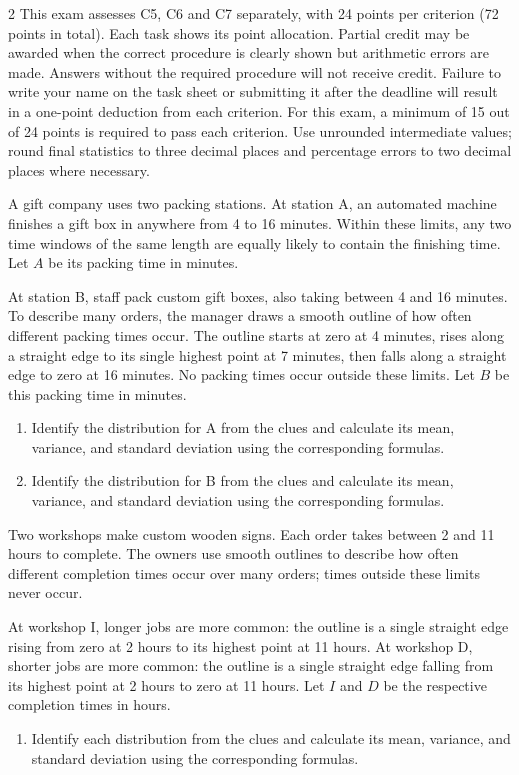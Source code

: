\begin{multicols}{2}
\vspace{-0.25cm}
This exam assesses C5, C6 and C7 separately, with 24 points per criterion
(72 points in total). Each task shows its point allocation. Partial credit
may be awarded when the correct procedure is clearly shown but arithmetic
errors are made. Answers without the required procedure will not receive credit.
Failure to write your name on the task sheet or submitting it after the deadline
will result in a one-point deduction from each criterion.
For this exam, a minimum of 15 out of 24 points is required to pass each criterion.
Use unrounded intermediate values; round final statistics to three decimal
places and percentage errors to two decimal places where necessary.

A gift company uses two packing stations. At station A, an automated machine
finishes a gift box in anywhere from 4 to 16 minutes. Within these limits,
any two time windows of the same length are equally likely to contain the
finishing time. Let $A$ be its packing time in minutes.

At station B, staff pack custom gift boxes, also taking between 4 and 16
minutes. To describe many orders, the manager draws a smooth outline of how
often different packing times occur. The outline starts at zero at 4 minutes,
rises along a straight edge to its single highest point at 7 minutes, then
falls along a straight edge to zero at 16 minutes. No packing times occur
outside these limits. Let $B$ be this packing time in minutes.
\begin{enumerate}[label=\textbf{(\alph*)}]
\item Identify the distribution for A from the clues and calculate its mean, variance, and standard deviation using the corresponding formulas. 
\item Identify the distribution for B from the clues and calculate its mean, variance, and standard deviation using the corresponding formulas. 
\end{enumerate}

Two workshops make custom wooden signs. Each order takes between 2 and
11 hours to complete. The owners use smooth outlines to describe how often
different completion times occur over many orders; times outside these limits
never occur.

At workshop I, longer jobs are more common: the outline is a single straight
edge rising from zero at 2 hours to its highest point at 11 hours.
At workshop D, shorter jobs are more common: the outline is a single straight
edge falling from its highest point at 2 hours to zero at 11 hours.
Let $I$ and $D$ be the respective completion times in hours.
\begin{enumerate}[label=\textbf{(\alph*)}]
\item Identify each distribution from the clues and calculate its mean, variance, and standard deviation using the corresponding formulas. 
\end{enumerate}


\end{multicols}
